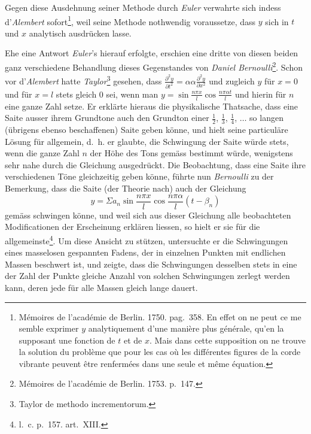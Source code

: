 \documentclass[12pt,a4paper]{book}
\theoremstyle{definition}
\theoremstyle{remark}
\begin{document}
Gegen diese Ausdehnung seiner Methode durch \textit{Euler} verwahrte sich indess d'\textit{Alembert} sofort\footnote{Mémoires de l'académie de Berlin. 1750. pag.~358. En effet on ne peut ce me semble exprimer $y$ analytiquement d'une manière plus générale, qu'en la supposant une fonction de $t$ et de $x$. Mais dans cette supposition on ne trouve la solution du problème que pour les cas où les différentes figures de la corde vibrante peuvent être renfermées dans une seule et même équation.}, weil seine Methode nothwendig voraussetze, dass $y$ sich in $t$ und $x$ analytisch ausdrücken lasse.

Ehe eine Antwort \textit{Euler}'s hierauf erfolgte, erschien eine dritte von diesen beiden ganz verschiedene Behandlung dieses Gegenstandes von \textit{Daniel Bernoulli}\footnote{Mémoires de l'académie de Berlin. 1753. p.~147.}. Schon vor d'\textit{Alembert} hatte \textit{Taylor}\footnote{Taylor de methodo incrementorum.} gesehen, dass $\frac{\partial^2 y}{\partial t^2} = \alpha\alpha\frac{\partial^2 y}{\partial x^2}$ und zugleich $y$ für $x = 0$ und für $x = l$ stets gleich $0$ sei, wenn man $y = \sin\frac{n\pi x}{l}\cos\frac{n\pi\alpha t}{l}$ und hierin für $n$ eine ganze Zahl setze. Er erklärte hieraus die physikalische Thatsache, dass eine Saite ausser ihrem Grundtone auch den Grundton einer $\frac{1}{2}$, $\frac{1}{3}$, $\frac{1}{4}$, $\ldots$ so langen (übrigens ebenso beschaffenen) Saite geben könne, und hielt seine particuläre Lösung für allgemein, d.~h. er glaubte, die Schwingung der Saite würde stets, wenn die ganze Zahl $n$ der Höhe des Tons gemäss bestimmt würde, wenigstens sehr nahe durch die Gleichung ausgedrückt. Die Beobachtung, dass eine Saite ihre verschiedenen Töne gleichzeitig geben könne, führte nun \textit{Bernoulli} zu der Bemerkung, dass die Saite (der Theorie nach) auch der Gleichung
\[ y = \Sigma a_n\sin\frac{n\pi x}{l}\cos\frac{n\pi\alpha}{l}(t - \beta_n) \]
gemäss schwingen könne, und weil sich aus dieser Gleichung alle beobachteten Modificationen der Erscheinung erklären liessen, so hielt er sie für die allgemeinste\footnote{l.~c. p.~157. art.~XIII.}. Um diese Ansicht zu stützen, untersuchte er die Schwingungen eines masselosen gespannten Fadens, der in einzelnen Punkten mit endlichen Massen beschwert ist, und zeigte, dass die Schwingungen desselben stets in eine der Zahl der Punkte gleiche Anzahl von solchen Schwingungen zerlegt werden kann, deren jede für alle Massen gleich lange dauert.
\end{document}
